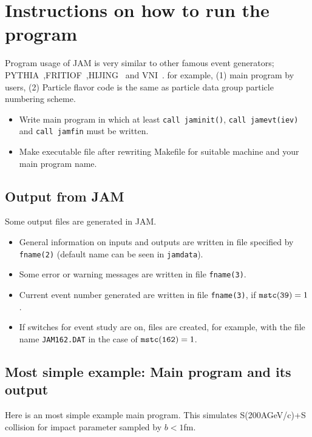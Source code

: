 \documentclass[]{article}
\newcommand{\ttt}[1]{{\tt#1}}
\begin{document}
\section{Instructions on how to run the program}

 Program usage of JAM is very similar to other famous event generators;
 PYTHIA~\cite{pythia},FRITIOF~\cite{fritiof},HIJING~\cite{hijing}
 and VNI~\cite{vni}. for example, (1) main program by users,
 (2) Particle flavor code is the same as particle data group particle
     numbering scheme.

\begin{itemize}
\item Write main program in which at least 
       \ttt{call jaminit()}, \ttt{call jamevt(iev)} and
        \ttt{call jamfin} must be written.
\item Make executable  file after rewriting Makefile for suitable
      machine and your main program name.
\end{itemize}

\subsection{Output from JAM}
Some output files are generated in JAM.
\begin{itemize}
\item General information on inputs and outputs 
        are written in file
     specified by \ttt{fname(2)} (default name can be seen in \ttt{jamdata}).
\item
    Some error or warning messages are written in file 
    \ttt{fname(3)}.
\item
    Current event number generated are written in file \ttt{fname(3)},
    if $\ttt{mstc(39)}=1$.
\item
   If switches for event study are on,
   files are created, for example,  with the file name \ttt{JAM162.DAT}
   in the case of $\ttt{mstc(162)}=1$.

\end{itemize}



\subsection{Most simple example: Main program and its output}
Here is an most simple example main program. This simulates
S(200AGeV/c)+S collision for impact parameter sampled by $b<1$fm.
\end{document}
